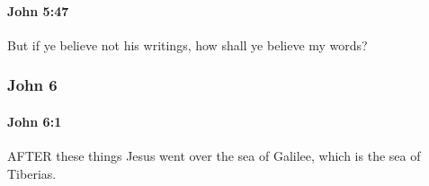 		\paragraph{John 5:47} %
			\label{JOHN-5-47}

			But if ye believe not his writings, how shall ye believe my words?

			\begin{framed}
			\scriptsize
				\begin{compactdesc}
					\item[SBLG] 
				\end{compactdesc}
			\end{framed}

	\subsubsection{John 6} %
		\label{JOHN-6}
		
		\paragraph{John 6:1} %
			\label{JOHN-6-1}

			AFTER these things Jesus went over the sea of Galilee, which is the sea of Tiberias.

